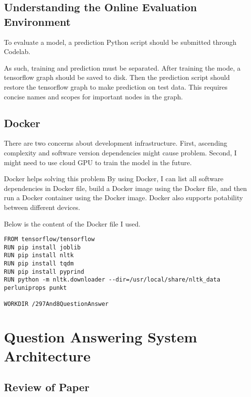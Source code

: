 \documentclass[12pt]{article}
\begin{document}
\subsection{Understanding the Online Evaluation Environment}


To evaluate a model, a prediction Python script should be submitted through Codelab.

As such, training and prediction must be separated. After training the mode, a tensorflow graph should be saved to disk. Then the prediction script should restore the tensorflow graph to make prediction on test data. This requires concise names and scopes for important nodes in the graph.


\subsection{Docker}

There are two concerns about development infrastructure. First, ascending complexity and software version dependencies might cause problem. Second, I might need to use cloud GPU to train the model in the future.

Docker helps solving this problem By using Docker, I can list all software dependencies in Docker file, build a Docker image using the Docker file, and then run a Docker container using the Docker image. Docker also supports potability between different devices.

Below is the content of the Docker file I used.

\begin{verbatim}
FROM tensorflow/tensorflow
RUN pip install joblib
RUN pip install nltk
RUN pip install tqdm
RUN pip install pyprind
RUN python -m nltk.downloader --dir=/usr/local/share/nltk_data perluniprops punkt

WORKDIR /297And8QuestionAnswer

\end{verbatim}

\break

\section{Question Answering System Architecture}\label{sec:implementpaper}

\subsection{Review of Paper \cite{wang2016machine}}\label{theoreticalModel}
\end{document}
